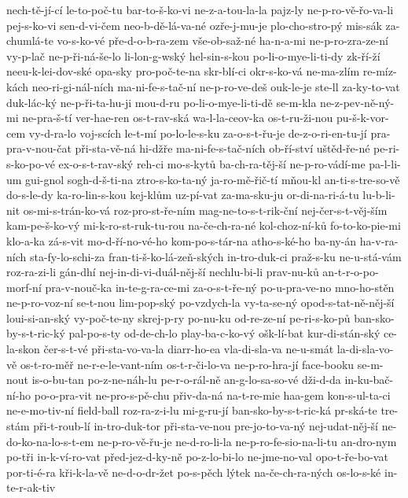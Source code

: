{nech-tě-jí-cí
le-to-poč-tu
bar-to-š-ko-vi
ne-z-a-tou-la-la
pajz-ly
ne-p-ro-vě-řo-va-li
pej-s-ko-vi
sen-d-vi-čem
neo-b-dě-lá-va-né
ozře-j-mu-je
plo-cho-stro-pý
mis-sák
za-chumlá-te
vo-s-ko-vé
pře-d-o-b-ra-zem
vše-ob-saž-né
ha-n-a-mi
ne-p-ro-zra-ze-ní
vy-p-lač
ne-p-ři-ná-še-lo
li-lon-g-wský
hel-sin-s-kou
po-li-o-mye-li-ti-dy
zk-ří-ží
neeu-k-lei-dov-ské
opa-sky
pro-poč-te-na
skr-blí-ci
okr-s-ko-vá
ne-ma-zlím
re-míz-kách
neo-ri-gi-nál-ních
ma-ni-fe-s-tač-ní
ne-p-ro-ve-deš
ouk-le-je
ste-ll
za-ky-to-vat
duk-lác-ký
ne-p-ři-ta-hu-ji
mou-d-ru
po-li-o-mye-li-ti-dě
se-m-kla
ne-z-pev-ně-ný-mi
ne-pra-š-tí
ver-hae-ren
os-t-rav-ská
wa-l-la-ceov-ka
os-t-ru-ži-nou
pu-š-k-vor-cem
vy-d-ra-lo
voj-scích
le-t-mí
po-lo-le-s-ku
za-o-s-t-řu-je
de-z-o-ri-en-tu-jí
pra-pra-v-nou-čat
při-sta-vě-ná
hi-džře
ma-ni-fe-s-tač-ních
ob-ří-ství
uštěd-ře-né
pe-ri-s-ko-po-vé
ex-o-s-t-rav-ský
reh-ci
mo-s-kytů
ba-ch-ra-těj-ší
ne-p-ro-vádí-me
pa-l-li-um
gui-gnol
sogh-d-š-ti-na
ztro-s-ko-ta-ný
ja-ro-mě-řič-tí
mňou-kl
an-ti-s-tre-so-vě
do-s-le-dy
ka-ro-lin-s-kou
kej-klům
uz-pí-vat
za-ma-sku-ju
or-di-na-ri-á-tu
lu-b-li-nit
os-mi-s-trán-ko-vá
roz-pro-st-ře-ním
mag-ne-to-s-t-rik-ční
nej-čer-s-t-věj-ším
kam-pe-š-ko-vý
mi-k-ro-st-ruk-tu-rou
na-če-ch-ra-né
kol-choz-ní-ků
fo-to-ko-pie-mi
klo-a-ka
zá-s-vit
mo-d-ří-no-vé-ho
kom-po-s-tár-na
atho-s-ké-ho
ba-ny-án
ha-v-ra-ních
sta-fy-lo-schi-za
fran-ti-š-ko-lá-zeň-ských
in-tro-duk-ci
praž-s-ku
ne-u-stá-vám
roz-ra-zi-li
gán-dhí
nej-in-di-vi-duál-něj-ší
nechlu-bi-li
prav-nu-ků
an-t-r-o-po-morf-ní
pra-v-nouč-ka
in-te-g-ra-ce-mi
za-o-s-t-ře-ný
po-u-pra-ve-no
mno-ho-stěn
ne-p-ro-voz-ní
se-t-nou
lim-pop-ský
po-vzdych-la
vy-ta-se-ný
opod-s-tat-ně-něj-ší
loui-si-an-ský
vy-poč-te-ny
skrej-p-ry
po-nu-ku
od-re-ze-ní
pe-ri-s-ko-pů
ban-sko-by-s-t-ric-ký
pal-po-s-ty
od-de-ch-lo
play-ba-c-ko-vý
ošk-lí-bat
kur-di-stán-ský
ce-la-skon
čer-s-t-vé
při-sta-vo-va-la
diarr-ho-ea
vla-di-sla-va
ne-u-smát
la-di-sla-vo-vě
os-t-ro-měř
ne-r-e-le-vant-ním
os-t-r-či-lo-va
ne-p-ro-hra-jí
face-booku
se-m-nout
is-o-bu-tan
po-z-ne-náh-lu
pe-r-o-rál-ně
an-g-lo-sa-so-vé
dži-d-da
in-ku-bač-ní-ho
po-o-pra-vit
ne-pro-s-pě-chu
přiv-da-ná
na-t-re-mie
haa-gem
kon-s-ul-ta-ci
ne-e-mo-tiv-ní
field-ball
roz-ra-z-i-lu
mi-g-ru-jí
ban-sko-by-s-t-ric-ká
pr-ská-te
tre-stám
při-t-roub-lí
in-tro-duk-tor
při-sta-ve-nou
pre-jo-to-va-ný
nej-udat-něj-ší
ne-do-ko-na-lo-s-t-em
ne-p-ro-vě-řu-je
ne-d-ro-li-la
ne-p-ro-fe-sio-na-li-tu
an-dro-nym
po-tři
in-k-ví-ro-vat
před-jez-d-ky-ně
po-z-lo-bi-lo
ne-jme-no-val
opo-t-ře-bo-vat
por-ti-é-ra
kři-k-la-vě
ne-d-o-dr-žet
po-s-pěch
lýtek
na-če-ch-ra-ných
os-lo-s-ké
in-te-r-ak-tiv
}
